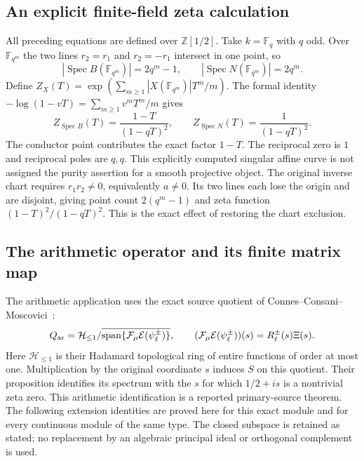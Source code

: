 \subsection{An explicit finite-field zeta calculation}
All preceding equations are defined over $\mathbb Z[1/2]$.
Take $k=\mathbb F_q$ with $q$ odd.
Over $\mathbb F_{q^m}$ the two lines $r_2=r_1$ and $r_2=-r_1$
intersect in one point, so
\[
 |\operatorname{Spec}B(\mathbb F_{q^m})|=2q^m-1,\qquad
 |\operatorname{Spec}N(\mathbb F_{q^m})|=2q^m.
\]
Define $Z_X(T)=\exp(\sum_{m\ge1}|X(\mathbb F_{q^m})|T^m/m)$.
The formal identity $-\log(1-vT)=\sum_{m\ge1}v^mT^m/m$ gives
\begin{equation}\label{eq:node-zeta}
 Z_{\operatorname{Spec}B}(T)=\frac{1-T}{(1-qT)^2},
 \qquad Z_{\operatorname{Spec}N}(T)=\frac1{(1-qT)^2}.
\end{equation}
The conductor point contributes the exact factor $1-T$.
The reciprocal zero is $1$ and reciprocal poles are $q,q$.
This explicitly computed singular affine curve is not assigned the
purity assertion for a smooth projective object.
The original inverse chart requires $r_1r_2\ne0$, equivalently $a\ne0$.
Its two lines each lose the origin and are disjoint, giving point count
$2(q^m-1)$ and zeta function $(1-T)^2/(1-qT)^2$.
This is the exact effect of restoring the chart exclusion.

\subsection{The arithmetic operator and its finite matrix map}
The arithmetic application uses the exact source quotient of
Connes--Consani--Moscovici~\cite[Section 3.6, Proposition 3.6]{ccmProlate2024}:
\[
 Q_{\rm ar}=\mathcal H_{\le1}/
 \overline{\operatorname{span}
 \{\mathcal F_\mu\mathcal E(\psi_\ell^\pm)\}},\qquad
 (\mathcal F_\mu\mathcal E(\psi_\ell^\pm))(s)=R_\ell^\pm(s)\Xi(s).
\]
Here $\mathcal H_{\le1}$ is their Hadamard topological ring of entire
functions of order at most one. Multiplication by the original coordinate
$s$ induces $S$ on this quotient. Their proposition identifies its
spectrum with the $s$ for which $1/2+is$ is a nontrivial zeta zero.
This arithmetic identification is a reported primary-source theorem.
The following extension identities are proved here for this exact
module and for every continuous module of the same type.
The closed subspace is retained as stated; no replacement by an
algebraic principal ideal or orthogonal complement is used.

